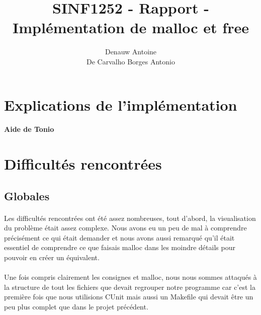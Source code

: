 \documentclass[10pt,a4paper]{article}
\begin{document}
\author{Denauw Antoine\\ De Carvalho Borges Antonio}
\title{SINF1252 - Rapport - Implémentation de malloc et free}
\maketitle

\tableofcontents


\newpage

\section{Explications de l'implémentation}

\paragraph{Aide de Tonio}


\section{Difficultés rencontrées}

\subsection{Globales}

\paragraph{}Les difficultés rencontrées ont été assez nombreuses, tout d'abord, la visualisation du problème était assez complexe. Nous avons eu un peu de mal à comprendre précisément ce qui était demander et nous avons aussi remarqué qu'il était essentiel de comprendre ce que faisais malloc dans les moindre détails pour pouvoir en créer un équivalent.

\paragraph{}Une fois compris clairement les consignes et malloc, nous nous sommes attaqués à la structure de tout les fichiers que devait regrouper notre programme car c'est la première fois que nous utilisions CUnit mais aussi un Makefile qui devait être un peu plus complet que dans le projet précédent.
\end{document}
